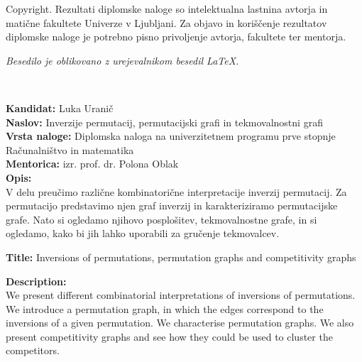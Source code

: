 \documentclass[a4paper, 12pt]{book}
\newcommand{\ttitle}{Inverzije permutacij, permutacijski grafi in tekmovalnostni grafi}
\newcommand{\ttitleEn}{Inversions of permutations, permutation graphs and competitivity graphs}
\newcommand{\clearemptydoublepage}{\newpage{\pagestyle{empty}\cleardoublepage}}
\begin{document}
\thispagestyle{empty}
\vspace*{8cm}

\noindent
{\sc Copyright}. 
Rezultati diplomske naloge so intelektualna lastnina avtorja in matične fakultete Univerze v Ljubljani.
Za objavo in koriščenje rezultatov diplomske naloge je potrebno pisno privoljenje avtorja, fakultete ter mentorja.

\begin{center}
\mbox{}\vfill
\emph{Besedilo je oblikovano z urejevalnikom besedil \LaTeX.}
\end{center}
\clearemptydoublepage

\thispagestyle{empty}
\
\vfill

\bigskip
\noindent\textbf{Kandidat:} Luka Uranič\\
\noindent\textbf{Naslov:} \ttitle\\
\noindent\textbf{Vrsta naloge:} Diplomska naloga na univerzitetnem programu prve stopnje Računalništvo in matematika \\
\noindent\textbf{Mentorica:}  izr. prof. dr. Polona Oblak\\

\bigskip
\noindent\textbf{Opis:}\\
V delu preučimo različne kombinatorične interpretacije inverzij permutacij. Za permutacijo predstavimo njen graf inverzij in karakteriziramo permutacijske grafe. Nato si ogledamo njihovo posplošitev, tekmovalnostne grafe, in si ogledamo, kako bi jih lahko uporabili za gručenje tekmovalcev.

\bigskip
\noindent\textbf{Title:} \ttitleEn

\bigskip
\noindent\textbf{Description:}\\
We present different combinatorial interpretations of inversions of permutations. We introduce a permutation graph, in which the edges correspond to the inversions of a given permutation. We characterise permutation graphs. We also present competitivity graphs and see how they could be used to cluster the competitors.

\vfill



\vspace{2cm}
\end{document}
